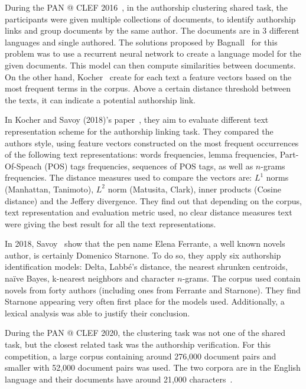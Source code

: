 During the PAN @ CLEF 2016~\cite{pan16}, in the authorship clustering shared task, the participants were given multiple collections of documents, to identify authorship links and group documents by the same author.
The documents are in 3 different languages and single authored.
The solutions proposed by Bagnall~\cite{bagnall_pan16} for this problem was to use a recurrent neural network to create a language model for the given documents. This model can then compute similarities between documents.
On the other hand, Kocher~\cite{kocher_pan16} create for each text a feature vectors based on the most frequent terms in the corpus.
Above a certain distance threshold between the texts, it can indicate a potential authorship link.

In Kocher and Savoy (2018)'s paper~\cite{kocher_linking}, they aim to evaluate different text representation scheme for the authorship linking task.
They compared the authors style, using feature vectors constructed on the most frequent occurrences of the following text representations: words frequencies, lemma frequencies, Part-Of-Speach (POS) tags frequencies, sequences of POS tags, as well as $n$-grams frequencies.
The distance measures used to compare the vectors are: $L^1$ norms (Manhattan, Tanimoto), $L^2$ norm (Matusita, Clark), inner products (Cosine distance) and the Jeffery divergence.
They find out that depending on the corpus, text representation and evaluation metric used, no clear distance measures text were giving the best result for all the text representations.

In 2018, Savoy~\cite{savoy_starnone} show that the pen name Elena Ferrante, a well known novels author, is certainly Domenico Starnone.
To do so, they apply six authorship identification models: Delta, Labbé's distance, the nearest shrunken centroids, naïve Bayes, k-nearest neighbors and character $n$-grams.
The corpus used contain novels from forty authors (including ones from Ferrante and Starnone).
They find Starnone appearing very often first place for the models used.
Additionally, a lexical analysis was able to justify their conclusion.

During the PAN @ CLEF 2020, the clustering task was not one of the shared task, but the closest related task was the authorship verification.
For this competition, a large corpus containing around 276,000 document pairs and smaller with 52,000 document pairs was used.
The two corpora are in the English language and their documents have around 21,000 characters~\cite{overview_pan20}.

